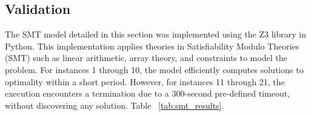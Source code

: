 \subsection{Validation}
The SMT model detailed in this section was implemented using the Z3 library in Python. This implementation applies theories in Satisfiability Modulo Theories (SMT) such as linear arithmetic, array theory, and constraints to model the problem. For instances 1 through 10, the model efficiently computes solutions to optimality within a short period. However, for instances 11 through 21, the execution encounters a termination due to a 300-second pre-defined timeout, without discovering any solution. Table ~\ref{tab:smt_results}. 
